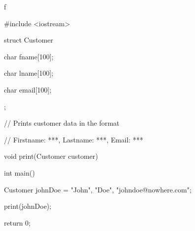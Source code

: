 f

\begin{consolethree}[escapeinside=||]

#include <iostream>



struct Customer

{

    char fname[100];

    char lname[100];

    char email[100];

};



// Prints customer data in the format

// Firstname: ***, Lastname: ***, Email: ***

void print(Customer customer)

{

}



int main()

{

    Customer johnDoe = {"John", "Doe", "johndoe@nowhere.com"};

    print(johnDoe);

    return 0;

}

\end{consolethree}

